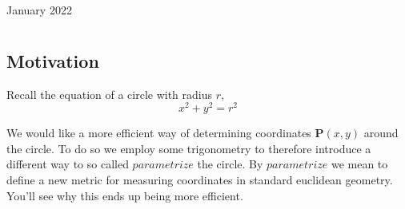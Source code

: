 \documentclass[12pt,oneside]{book} %
\begin{document}
	\renewcommand*{\term}{Term 2} %
	\renewcommand*{\coursecode}{MCR3U} %
	\renewcommand*{\coursename}{Course Name} %
	\renewcommand*{\thelecnum}{9} %
	\renewcommand*{\profname}{Prof Name} %
	\renewcommand*{\colink}{http://www.student.math.uwaterloo.ca/~c2kent} %
	\clearpage
	\pagestyle{classlecture}
\begin{lec}{January 2022}
	\chapter{\chapname\chaplec}

  \section{Motivation}
  Recall the equation of a circle with radius $r$,
  \[
      x^2 + y^2 = r^2
  \] 

   \begin{center}
   \end{center}
   
   We would like a more efficient way of determining coordinates $\textbf{P}(x,y)$ around the circle. To do so we employ
   some trigonometry to therefore introduce a different way to so called $ \textit{parametrize}$ the circle. By
   $\textit{parametrize}$ we mean to define a new metric for measuring coordinates in standard euclidean geometry.
   You'll see why this ends up being more efficient.


\end{lec}
\end{document}
